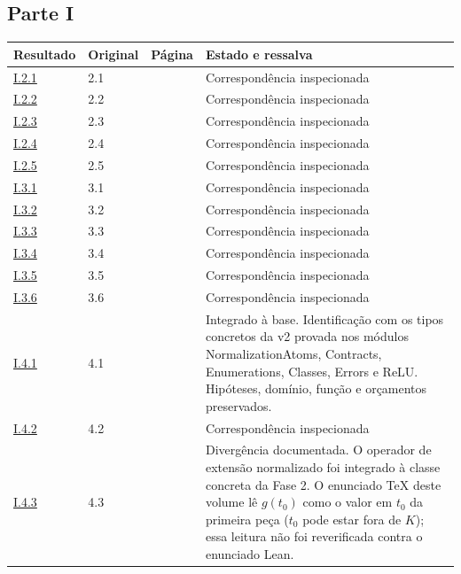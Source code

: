 \subsection*{Parte I}
\small
\begin{longtable}{@{}p{.11\linewidth}p{.09\linewidth}p{.09\linewidth}p{.59\linewidth}@{}}
\toprule Resultado & Original & Página & Estado e ressalva\\\midrule\endhead
\hyperref[map:artigo_1:2.1]{I.2.1} & 2.1 & \pageref{map:artigo_1:2.1} & Correspondência inspecionada\\[4pt]
\hyperref[map:artigo_1:2.2]{I.2.2} & 2.2 & \pageref{map:artigo_1:2.2} & Correspondência inspecionada\\[4pt]
\hyperref[map:artigo_1:2.3]{I.2.3} & 2.3 & \pageref{map:artigo_1:2.3} & Correspondência inspecionada\\[4pt]
\hyperref[map:artigo_1:2.4]{I.2.4} & 2.4 & \pageref{map:artigo_1:2.4} & Correspondência inspecionada\\[4pt]
\hyperref[map:artigo_1:2.5]{I.2.5} & 2.5 & \pageref{map:artigo_1:2.5} & Correspondência inspecionada\\[4pt]
\hyperref[map:artigo_1:3.1]{I.3.1} & 3.1 & \pageref{map:artigo_1:3.1} & Correspondência inspecionada\\[4pt]
\hyperref[map:artigo_1:3.2]{I.3.2} & 3.2 & \pageref{map:artigo_1:3.2} & Correspondência inspecionada\\[4pt]
\hyperref[map:artigo_1:3.3]{I.3.3} & 3.3 & \pageref{map:artigo_1:3.3} & Correspondência inspecionada\\[4pt]
\hyperref[map:artigo_1:3.4]{I.3.4} & 3.4 & \pageref{map:artigo_1:3.4} & Correspondência inspecionada\\[4pt]
\hyperref[map:artigo_1:3.5]{I.3.5} & 3.5 & \pageref{map:artigo_1:3.5} & Correspondência inspecionada\\[4pt]
\hyperref[map:artigo_1:3.6]{I.3.6} & 3.6 & \pageref{map:artigo_1:3.6} & Correspondência inspecionada\\[4pt]
\hyperref[map:artigo_1:4.1]{I.4.1} & 4.1 & \pageref{map:artigo_1:4.1} & Integrado à base. Identificação com os tipos concretos da v2 provada nos módulos NormalizationAtoms, Contracts, Enumerations, Classes, Errors e ReLU. Hipóteses, domínio, função e orçamentos preservados.\\[4pt]
\hyperref[map:artigo_1:4.2]{I.4.2} & 4.2 & \pageref{map:artigo_1:4.2} & Correspondência inspecionada\\[4pt]
\hyperref[map:artigo_1:4.3]{I.4.3} & 4.3 & \pageref{map:artigo_1:4.3} & Divergência documentada. O operador de extensão normalizado foi integrado à classe concreta da Fase 2. O enunciado TeX deste volume lê $g(t_0)$ como o valor em $t_0$ da primeira peça ($t_0$ pode estar fora de $K$); essa leitura não foi reverificada contra o enunciado Lean.\\[4pt]

\end{longtable}
